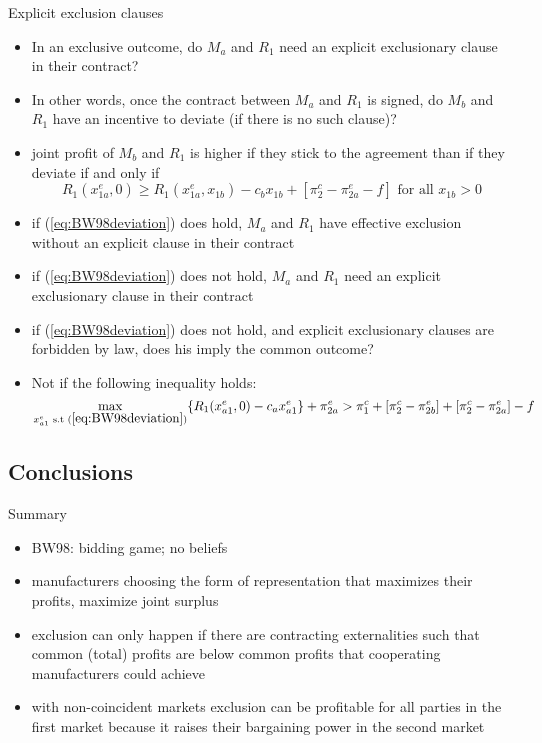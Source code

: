 \documentclass[11pt,english]{beamer}
\begin{document}
\begin{frame}[allowframebreaks]{Explicit exclusion clauses}
  \begin{itemize}
  \item In an exclusive outcome, do $M_a$ and $R_1$ need an explicit
    exclusionary clause in their contract?
  \item In other words, once the contract between $M_a$ and $R_1$ is
    signed, do $M_b$ and $R_1$ have an incentive to deviate (if there
    is no such clause)?
  \item joint profit of $M_b$ and $R_1$ is higher if they stick to the
    agreement than if they deviate if and only if
    \begin{equation}
      \label{eq:BW98deviation}
      R_1(x_{1a}^e,0) \geq R_1(x_{1a}^e,x_{1b})-c_b x_{1b} + [\pi_2^c
      -\pi_{2a}^e -f] \text{ for all } x_{1b} > 0
    \end{equation}
  \item if (\ref{eq:BW98deviation}) does hold, $M_a$ and $R_1$ have
    effective exclusion without an explicit clause in their contract
  \item if (\ref{eq:BW98deviation}) does not hold, $M_a$ and $R_1$
    need an explicit exclusionary clause in their contract
  \item if (\ref{eq:BW98deviation}) does not hold, and explicit
    exclusionary clauses are forbidden by law, does his imply the
    common outcome?
  \item Not if the following inequality holds:
    \begin{equation*}
      \max_{x_{a1}^e \text{ s.t } (\ref{eq:BW98deviation})}
      \{R_1(x_{a1}^e,0)-c_a x_{a1}^e \} + \pi_{2a}^e > \pi_1^c +
      [\pi_2^c -\pi_{2b}^e] + [\pi_2^c-\pi_{2a}^e] - f
    \end{equation*}
  \end{itemize}
\end{frame}


\subsection{Conclusions}

\begin{frame}[allowframebreaks]{Summary}
  \begin{itemize}
  \item BW98: bidding game; no beliefs
  \item manufacturers choosing the form of representation that
    maximizes their profits, maximize joint surplus
  \item exclusion can only happen if there are contracting
    externalities such that common (total) profits are below common
    profits that cooperating manufacturers could achieve
  \item with non-coincident markets exclusion can be profitable for
    all parties in the first market because it raises their bargaining
    power in the second market
  \end{itemize}
\end{frame}
\end{document}
